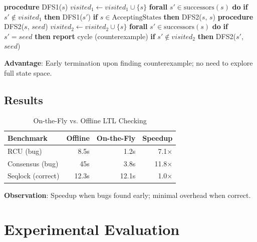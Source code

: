 \documentclass[conference]{IEEEtran}
\begin{document}
\begin{algorithm}
\caption{Nested DFS (On-the-Fly LTL Checking)}
\label{alg:ndfs}
\begin{algorithmic}
\STATE \textbf{procedure} \textsc{DFS1}($s$)
\STATE \quad $visited_1 \gets visited_1 \cup \{s\}$
\STATE \quad \textbf{forall} $s' \in \text{successors}(s)$ \textbf{do}
\STATE \quad \quad \textbf{if} $s' \notin visited_1$ \textbf{then}
\STATE \quad \quad \quad \textsc{DFS1}($s'$)
\STATE \quad \textbf{if} $s \in \text{AcceptingStates}$ \textbf{then}
\STATE \quad \quad \textsc{DFS2}($s$, $s$) 
\STATE
\STATE \textbf{procedure} \textsc{DFS2}($s$, $seed$)
\STATE \quad $visited_2 \gets visited_2 \cup \{s\}$
\STATE \quad \textbf{forall} $s' \in \text{successors}(s)$ \textbf{do}
\STATE \quad \quad \textbf{if} $s' = seed$ \textbf{then}
\STATE \quad \quad \quad \textbf{report} cycle (counterexample)
\STATE \quad \quad \textbf{if} $s' \notin visited_2$ \textbf{then}
\STATE \quad \quad \quad \textsc{DFS2}($s'$, $seed$)
\end{algorithmic}
\end{algorithm}

\textbf{Advantage}: Early termination upon finding counterexample; no need to explore full state space.

\subsection{Results}

\begin{table}[h]
\centering
\caption{On-the-Fly vs. Offline LTL Checking}
\label{tab:onthefly_results}
\begin{tabular}{lrrr}
\toprule
\textbf{Benchmark} & \textbf{Offline} & \textbf{On-the-Fly} & \textbf{Speedup} \\
\midrule
RCU (bug) & 8.5s & 1.2s & 7.1× \\
Consensus (bug) & 45s & 3.8s & 11.8× \\
Seqlock (correct) & 12.3s & 12.1s & 1.0× \\
\bottomrule
\end{tabular}
\end{table}

\textbf{Observation}: Speedup when bugs found early; minimal overhead when correct.

\section{Experimental Evaluation}
\label{sec:evaluation}
\end{document}
